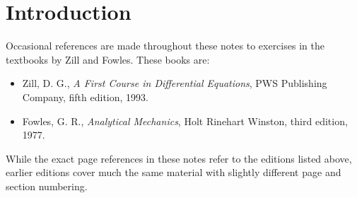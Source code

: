 %
%
%
%

\chapter{Introduction}
\label{pre chp}

Occasional references are made throughout these notes to exercises in the 
textbooks by Zill and Fowles.  These books are:

\begin{itemize}
\item Zill, D. G., {\em A First Course in Differential Equations}, PWS
Publishing Company, fifth edition, 1993.
\item Fowles, G. R., {\em Analytical Mechanics}, Holt Rinehart Winston,
third edition, 1977.
\end{itemize}

While the exact page references in these notes refer to the editions listed 
above, earlier editions cover much the same material with slightly different 
page and section numbering.

